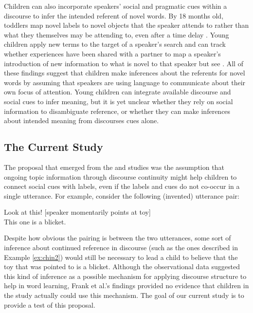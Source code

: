 \documentclass[man]{apa2}
\begin{document}
Children can also incorporate speakers' social and pragmatic cues within a discourse to infer the intended referent of novel words. By 18 months old, toddlers map novel labels to novel objects that the speaker attends to rather than what they themselves may be attending to, even after a time delay \cite{baldwin1991,baldwin1993}.  Young children apply new terms to the target of a speaker's search \cite{tomasello1994} and can track whether experiences have been shared with a partner to map a speaker's introduction of new information to what is novel to that speaker \cite{akhtar1996} but see .  All of these findings suggest that children make inferences about the referents for novel words by assuming that speakers are using language to communicate about their own focus of attention.  Young children can integrate available discourse and social cues to infer meaning, but it is yet unclear whether they rely on social information to disambiguate reference, or whether they can make inferences about intended meaning from discourses cues alone. 



\subsection{The Current Study}

The proposal that emerged from the  and  studies was the assumption that ongoing topic information through discourse continuity might help children to connect social cues with labels, even if the labels and cues do not co-occur in a single utterance.  For example, consider the following (invented) utterance pair:

\begin{example}
\label{ex:blicket}
Look at this! [speaker momentarily points at toy] \\
This one is a blicket.
\end{example}

\noindent Despite how obvious the pairing is between the two utterances, some sort of inference about continued reference in discourse (such as the ones described in Example \ref{ex:chin2}) would still be necessary to lead a child to believe that the toy that was pointed to is a blicket.  Although the observational data suggested this kind of inference as a possible mechanism for applying discourse structure to help in word learning, Frank et al.'s findings provided no evidence that children in the study actually could use this mechanism.  The goal of our current study is to provide a test of this proposal. 
\end{document}
